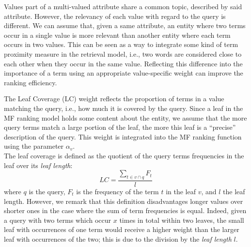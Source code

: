 Values part of a multi-valued attribute share a common topic, described by said attribute. However, the relevancy of each value with regard to the query is different. We can assume that, given a same attribute, an entity where two terms occur in a single value is more relevant than another entity where each term occurs in two values. This can be seen as a way to integrate some kind of term proximity measure in the retrieval model, i.e., two words are considered close to each other when they occur in the same value. Reflecting this difference into the importance of a term using an appropriate value-specific weight can improve the ranking efficiency.

The Leaf Coverage (LC) weight reflects the proportion of terms in a value matching the query, i.e., how much it is covered by the query. Since a leaf in the \gls{MF} ranking model holds some content about the entity, we assume that the more query terms match a large portion of the leaf, the more this leaf is a ``precise'' description of the query. This weight is integrated into the \gls{MF} ranking function using the parameter $\alpha_v$.\\

The leaf coverage is defined as the quotient of the query terms frequencies in the leaf over its \emph{leaf length}:
$$
LC = \frac{\sum_{t\in v \cap q}{F_t}}{l}
$$
where $q$ is the query, $F_t$ is the frequency of the term $t$ in the leaf $v$, and $l$ the leaf length.
However, we remark that this definition disadvantages longer values over shorter ones in the case where the sum of term frequencies is equal. Indeed, given a query with two terms which occur $x$ times in total within two leaves, the small leaf with occurrences of one term would receive a higher weight than the larger leaf with occurrences of the two; this is due to the division by the \emph{leaf length} $l$.\\

